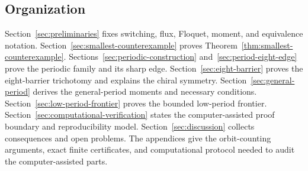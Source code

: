 \subsection{Organization}

Section~\ref{sec:preliminaries} fixes switching, flux, Floquet, moment, and equivalence notation.
Section~\ref{sec:smallest-counterexample} proves Theorem~\ref{thm:smallest-counterexample}. Sections~\ref{sec:periodic-construction} and~\ref{sec:period-eight-edge} prove the periodic family and its
sharp edge. Section~\ref{sec:eight-barrier} proves the eight-barrier trichotomy and explains the
chiral symmetry. Section~\ref{sec:general-period} derives the general-period moments and necessary
conditions. Section~\ref{sec:low-period-frontier} proves the bounded low-period frontier. Section~\ref{sec:computational-verification} states
the computer-assisted proof boundary and reproducibility model. Section~\ref{sec:discussion}
collects consequences and open problems. The appendices give the orbit-counting
arguments, exact finite certificates, and computational protocol needed to
audit the computer-assisted parts.
